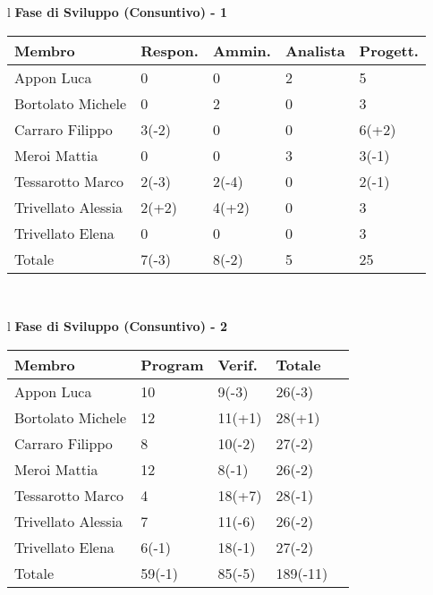 \begin{table}[hbtp]
\large{
\begin{tabular}{l}
\Large{\textbf{\textsf{Fase di Sviluppo (Consuntivo) - 1}}} \\
\begin{tabular}{||p{3.5cm}||p{2cm}||p{2cm}||p{2cm}||p{2cm}||}
\hline
\textbf{Membro} & \textbf{Respon.} & \textbf{Ammin.} & \textbf{Analista} & \textbf{Progett.}\\ \hline
{Appon Luca}&0&0&2&5 \\ \hline 
{Bortolato Michele} &0&2&0&3\\ \hline
{Carraro Filippo}&3\footnotesize{(-2)}&0&0&6\footnotesize{(+2)} \\ \hline
{Meroi Mattia}&0&0&3&3\footnotesize{(-1)}\\ \hline
{Tessarotto Marco} &2\footnotesize{(-3)}&2\footnotesize{(-4)}&0&2\footnotesize{(-1)}\\ \hline
{Trivellato Alessia} &2\footnotesize{(+2)}&4\footnotesize{(+2)}&0&3 \\ \hline
{Trivellato Elena} &0&0&0&3 \\ \hline
{Totale}& 7\footnotesize{(-3)}&8\footnotesize{(-2)}&5&25 \\ \hline
\end{tabular} \\
\end{tabular}
}
\end{table}  
\begin{table}[hbtp]
\large{
\begin{tabular}{l}
\Large{\textbf{\textsf{Fase di Sviluppo (Consuntivo) - 2}}} \\
\begin{tabular}{||p{3.5cm}||p{2cm}||p{2cm}||p{2cm}||p{2cm}||}
\hline
\textbf{Membro} & \textbf{Program} & \textbf{Verif.} & \textbf{Totale}\\ \hline
{Appon Luca}&10&9\footnotesize{(-3)}&26\footnotesize{(-3)} \\ \hline 
{Bortolato Michele} &12&11\footnotesize{(+1)}&28\footnotesize{(+1)}\\ \hline
{Carraro Filippo}&8&10\footnotesize{(-2)}&27\footnotesize{(-2)} \\ \hline
{Meroi Mattia}&12&8\footnotesize{(-1)}&26\footnotesize{(-2)}\\ \hline
{Tessarotto Marco} &4&18\footnotesize{(+7)}&28\footnotesize{(-1)}\\ \hline
{Trivellato Alessia} &7&11\footnotesize{(-6)}&26\footnotesize{(-2)} \\ \hline
{Trivellato Elena} &6\footnotesize{(-1)}&18\footnotesize{(-1)}&27\footnotesize{(-2)} \\ \hline
{Totale}& 59\footnotesize{(-1)}&85\footnotesize{(-5)}&189\footnotesize{(-11)} \\ \hline
\end{tabular} \\
\end{tabular}
}
\end{table}


